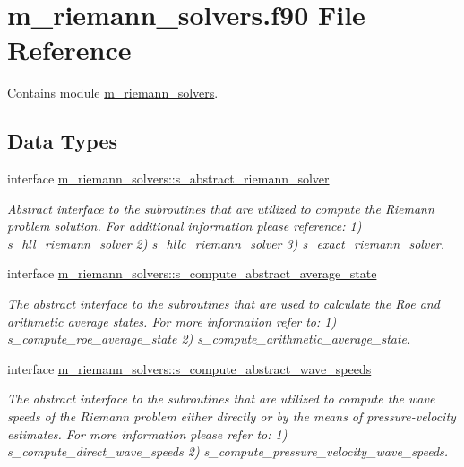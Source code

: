 \hypertarget{m__riemann__solvers_8f90}{}\section{m\+\_\+riemann\+\_\+solvers.\+f90 File Reference}
\label{m__riemann__solvers_8f90}


Contains module \hyperlink{namespacem__riemann__solvers}{m\+\_\+riemann\+\_\+solvers}.  


\subsection*{Data Types}
\begin{DoxyCompactItemize}
\item 
interface \hyperlink{interfacem__riemann__solvers_1_1s__abstract__riemann__solver}{m\+\_\+riemann\+\_\+solvers\+::s\+\_\+abstract\+\_\+riemann\+\_\+solver}
\begin{DoxyCompactList}\small\item\em Abstract interface to the subroutines that are utilized to compute the Riemann problem solution. For additional information please reference\+: 1) s\+\_\+hll\+\_\+riemann\+\_\+solver 2) s\+\_\+hllc\+\_\+riemann\+\_\+solver 3) s\+\_\+exact\+\_\+riemann\+\_\+solver. \end{DoxyCompactList}\item 
interface \hyperlink{interfacem__riemann__solvers_1_1s__compute__abstract__average__state}{m\+\_\+riemann\+\_\+solvers\+::s\+\_\+compute\+\_\+abstract\+\_\+average\+\_\+state}
\begin{DoxyCompactList}\small\item\em The abstract interface to the subroutines that are used to calculate the Roe and arithmetic average states. For more information refer to\+: 1) s\+\_\+compute\+\_\+roe\+\_\+average\+\_\+state 2) s\+\_\+compute\+\_\+arithmetic\+\_\+average\+\_\+state. \end{DoxyCompactList}\item 
interface \hyperlink{interfacem__riemann__solvers_1_1s__compute__abstract__wave__speeds}{m\+\_\+riemann\+\_\+solvers\+::s\+\_\+compute\+\_\+abstract\+\_\+wave\+\_\+speeds}
\begin{DoxyCompactList}\small\item\em The abstract interface to the subroutines that are utilized to compute the wave speeds of the Riemann problem either directly or by the means of pressure-\/velocity estimates. For more information please refer to\+: 1) s\+\_\+compute\+\_\+direct\+\_\+wave\+\_\+speeds 2) s\+\_\+compute\+\_\+pressure\+\_\+velocity\+\_\+wave\+\_\+speeds. \end{DoxyCompactList}\item 

\end{DoxyCompactItemize}
